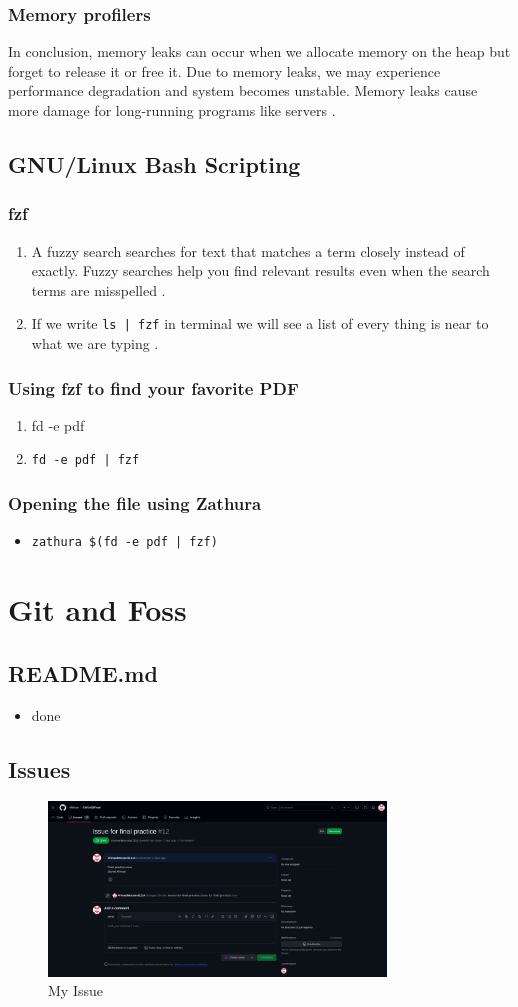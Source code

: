 \documentclass{article}
\begin{document}
\subsubsection{Memory profilers}
In conclusion, memory leaks can occur when we allocate memory on the heap but forget to release it or free it. Due to memory leaks, we may experience performance degradation and system becomes unstable. Memory leaks cause more damage for long-running programs like servers .
\newpage
\subsection{GNU/Linux Bash Scripting}
\subsubsection{fzf}
\begin{enumerate}
    \item{A fuzzy search searches for text that matches a term closely instead of exactly. Fuzzy searches help you find relevant results even when the search terms are misspelled .}
    \item{If we write \texttt{ls | fzf} in terminal we will see a list of every thing is near to what we are typing .}
\end{enumerate}
\subsubsection{Using fzf to find your favorite PDF}
\begin{enumerate}
    \item{fd -e pdf }
    \item{\texttt{fd -e pdf | fzf}}
\end{enumerate}
\subsubsection{Opening the file using Zathura}
\begin{itemize}
    \item{\texttt{zathura \$(fd -e pdf | fzf)}}
\end{itemize}
\section{Git and Foss}
\subsection{README.md}
\begin{itemize}
    \item{done}
\end{itemize}
\subsection{Issues}
\begin{figure}[h]
\centerline{\includegraphics[width = 0.8\textwidth]{issue.png}}
\caption{My Issue}
\label{fig}
\end{figure}
\end{document}
